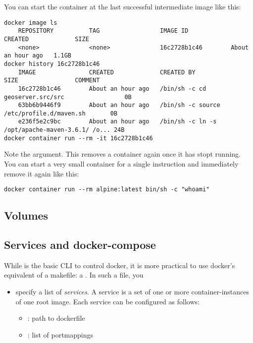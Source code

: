 You can start the container at the last successful intermediate image like this: 

\begin{lstlisting}
docker image ls 
    REPOSITORY          TAG                 IMAGE ID            CREATED             SIZE
    <none>              <none>              16c2728b1c46        About an hour ago   1.1GB
docker history 16c2728b1c46
    IMAGE               CREATED             CREATED BY                                      SIZE                COMMENT
    16c2728b1c46        About an hour ago   /bin/sh -c cd geoserver.src/src                 0B
    63bb6b9446f9        About an hour ago   /bin/sh -c source /etc/profile.d/maven.sh       0B
    e236f5e2c9bc        About an hour ago   /bin/sh -c ln -s /opt/apache-maven-3.6.1/ /o... 24B
docker container run --rm -it 16c2728b1c46
\end{lstlisting}

Note the  argument. This removes a container again once it has stopt running. You can start a very small container for a single instruction and immediately remove it again like this: 

\begin{lstlisting}
docker container run --rm alpine:latest bin/sh -c "whoami"
\end{lstlisting}

\subsection{Volumes}



\subsection{Services and docker-compose}
While  is the basic CLI to control docker, it is more practical to use docker's equivalent of a makefile: a . In such a file, you
\begin{itemize}
    \item specify a list of \emph{services}. A service is a set of one or more container-instances of one root image. Each service can be configured as follows:
    \begin{itemize}
        \item {}: path to dockerfile
        \item {}: list of portmappings
    \end{itemize}
\end{itemize}


